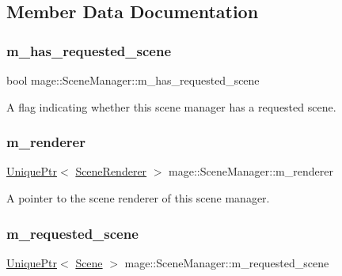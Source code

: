\subsection{Member Data Documentation}
\hypertarget{classmage_1_1_scene_manager_aff9889d9fc53a3524b0e88d10cd544d6}{}\label{classmage_1_1_scene_manager_aff9889d9fc53a3524b0e88d10cd544d6} 
\subsubsection{\texorpdfstring{m\+\_\+has\+\_\+requested\+\_\+scene}{m\_has\_requested\_scene}}
{\footnotesize\ttfamily bool mage\+::\+Scene\+Manager\+::m\+\_\+has\+\_\+requested\+\_\+scene\hspace{0.3cm}{\ttfamily [private]}}

A flag indicating whether this scene manager has a requested scene. \hypertarget{classmage_1_1_scene_manager_ac50da0df383825fa3b4627cb42981498}{}\label{classmage_1_1_scene_manager_ac50da0df383825fa3b4627cb42981498} 
\subsubsection{\texorpdfstring{m\+\_\+renderer}{m\_renderer}}
{\footnotesize\ttfamily \hyperlink{namespacemage_a3316d7143a973e37adf1110f2e80ca31}{Unique\+Ptr}$<$ \hyperlink{classmage_1_1_scene_renderer}{Scene\+Renderer} $>$ mage\+::\+Scene\+Manager\+::m\+\_\+renderer\hspace{0.3cm}{\ttfamily [private]}}

A pointer to the scene renderer of this scene manager. \hypertarget{classmage_1_1_scene_manager_a74bdb7b0805208b039991e9b9abc741f}{}\label{classmage_1_1_scene_manager_a74bdb7b0805208b039991e9b9abc741f} 
\subsubsection{\texorpdfstring{m\+\_\+requested\+\_\+scene}{m\_requested\_scene}}
{\footnotesize\ttfamily \hyperlink{namespacemage_a3316d7143a973e37adf1110f2e80ca31}{Unique\+Ptr}$<$ \hyperlink{classmage_1_1_scene}{Scene} $>$ mage\+::\+Scene\+Manager\+::m\+\_\+requested\+\_\+scene\hspace{0.3cm}{\ttfamily [private]}}

